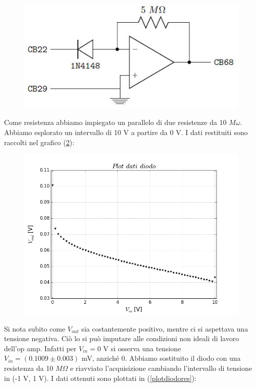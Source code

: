 \documentclass[journal, a4paper]{IEEEtran}
\begin{document}
\begin{figure}[htp]
\caption{}
\label{op-diod}
\centering
\includegraphics[scale=.4]{diodo}
\end{figure}

Come resistenza abbiamo impiegato un parallelo di due resistenze da 10 $M\omega$. Abbiamo esplorato un intervallo di 10 V a partire da 0 V. I dati restituiti sono raccolti nel grafico (\ref{plotdiodosil}):\\

\begin{figure}[htp]
\caption{}
\label{plotdiodosil}
\centering
\includegraphics[scale=.35]{plotdiodosil}
\end{figure}

Si nota subito come $V_{out}$ sia costantemente positivo, mentre ci si aspettava una tensione negativa. Ciò lo si può imputare alle condizioni non ideali di lavoro dell'op amp. Infatti per $V_{in} = 0$ V si osserva una tensione $V_{in} = (0.1009 \pm 0.003)$ mV, anziché 0. Abbiamo sostituito il diodo con una resistenza da 10 $M\Omega$ e riavviato l'acquisizione cambiando l'intervallo di tensione in (-1 V, 1 V). I dati ottenuti sono plottati in (\ref{plotdiodores}):\\
\end{document}
